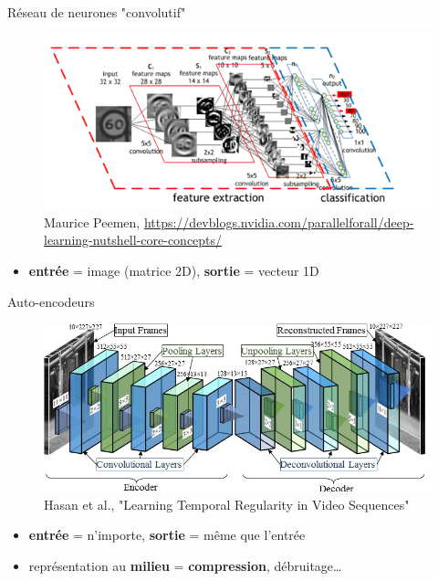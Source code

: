 \documentclass{beamer}
\begin{document}
\begin{frame}{Réseau de neurones "convolutif"}  
\begin{figure}
	\includegraphics[width=\textwidth]{convnet}\\
    \tiny{Maurice Peemen, \url{https://devblogs.nvidia.com/parallelforall/deep-learning-nutshell-core-concepts/}}
\end{figure}
\begin{itemize}
	\item \textbf{entrée} = image (matrice 2D), \textbf{sortie} = vecteur 1D
 \end{itemize}
\end{frame}

\begin{frame}{Auto-encodeurs}
\begin{figure}
	\includegraphics[width=\textwidth]{autoencoder}\\
    \tiny{Hasan et al., "Learning Temporal Regularity in Video Sequences"}
\end{figure}
\begin{itemize}
	\item \textbf{entrée} = n'importe, \textbf{sortie} = même que l'entrée
    \item représentation au \textbf{milieu} = \textbf{compression}, débruitage\dots
\end{itemize}
\end{frame}
\end{document}
